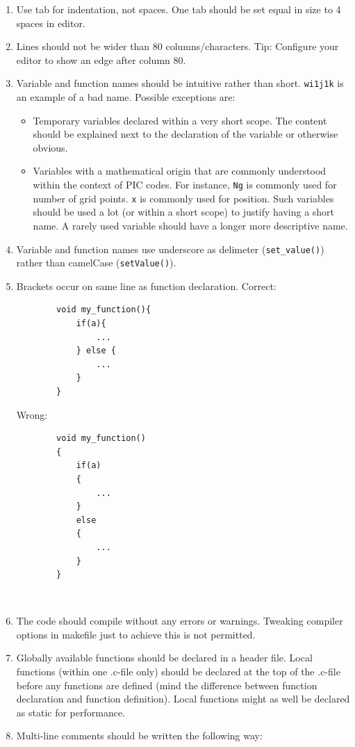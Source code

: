 \documentclass[10pt,a4paper]{article}
\begin{document}
\begin{enumerate}
	\item Use tab for indentation, not spaces. One tab should be set equal in size to 4 spaces in editor.
	\item Lines should not be wider than 80 columns/characters. Tip: Configure your editor to show an edge after column 80.
	\item Variable and function names should be intuitive rather than short. \lstinline$wi1j1k$ is an example of a bad name. Possible exceptions are:
		\begin{itemize}
			\item Temporary variables declared within a very short scope. The content should be explained next to the declaration of the variable or otherwise obvious.
			\item Variables with a mathematical origin that are commonly understood within the context of PIC codes. For instance, \lstinline$Ng$ is commonly used for number of grid points. \lstinline$x$ is commonly used for position. Such variables should be used a lot (or within a short scope) to justify having a short name. A rarely used variable should have a longer more descriptive name.
		\end{itemize}
	\item Variable and function names use underscore as delimeter (\lstinline$set_value()$) rather than camelCase (\lstinline$setValue()$).
	\item Brackets occur on same line as function declaration. Correct:
	\begin{lstlisting}
		void my_function(){
			if(a){
				...
			} else {
				...
			}
		}
	\end{lstlisting}
	Wrong:
	\begin{lstlisting}
		void my_function()
		{
			if(a)
			{
				...
			}
			else
			{
				...
			}
		}
	\end{lstlisting}\
	\item The code should compile without any errors or warnings. Tweaking compiler options in makefile just to achieve this is not permitted.
	\item Globally available functions should be declared in a header file. Local functions (within one .c-file only) should be declared at the top of the .c-file before any functions are defined (mind the difference between function declaration and function definition). Local functions might as well be declared as static for performance.
	\item Multi-line comments should be written the following way:

\end{enumerate}
\end{document}

